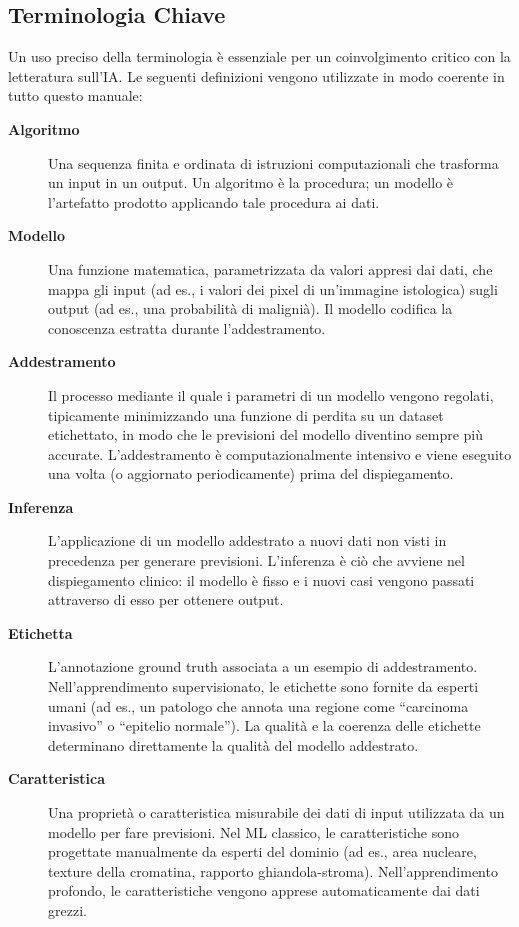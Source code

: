\subsection{Terminologia Chiave}

Un uso preciso della terminologia è essenziale per un coinvolgimento critico con la letteratura sull'IA. Le seguenti definizioni vengono utilizzate in modo coerente in tutto questo manuale:

\begin{description}
    \item[\textbf{Algoritmo}] Una sequenza finita e ordinata di istruzioni computazionali che trasforma un input in un output. Un algoritmo è la procedura; un modello è l'artefatto prodotto applicando tale procedura ai dati.

    \item[\textbf{Modello}] Una funzione matematica, parametrizzata da valori appresi dai dati, che mappa gli input (ad es., i valori dei pixel di un'immagine istologica) sugli output (ad es., una probabilità di malignià). Il modello codifica la conoscenza estratta durante l'addestramento.

    \item[\textbf{Addestramento}] Il processo mediante il quale i parametri di un modello vengono regolati, tipicamente minimizzando una funzione di perdita su un dataset etichettato, in modo che le previsioni del modello diventino sempre più accurate. L'addestramento è computazionalmente intensivo e viene eseguito una volta (o aggiornato periodicamente) prima del dispiegamento.

    \item[\textbf{Inferenza}] L'applicazione di un modello addestrato a nuovi dati non visti in precedenza per generare previsioni. L'inferenza è ciò che avviene nel dispiegamento clinico: il modello è fisso e i nuovi casi vengono passati attraverso di esso per ottenere output.

    \item[\textbf{Etichetta}] L'annotazione ground truth associata a un esempio di addestramento. Nell'apprendimento supervisionato, le etichette sono fornite da esperti umani (ad es., un patologo che annota una regione come ``carcinoma invasivo'' o ``epitelio normale''). La qualità e la coerenza delle etichette determinano direttamente la qualità del modello addestrato.

    \item[\textbf{Caratteristica}] Una proprietà o caratteristica misurabile dei dati di input utilizzata da un modello per fare previsioni. Nel ML classico, le caratteristiche sono progettate manualmente da esperti del dominio (ad es., area nucleare, texture della cromatina, rapporto ghiandola-stroma). Nell'apprendimento profondo, le caratteristiche vengono apprese automaticamente dai dati grezzi.
\end{description}

